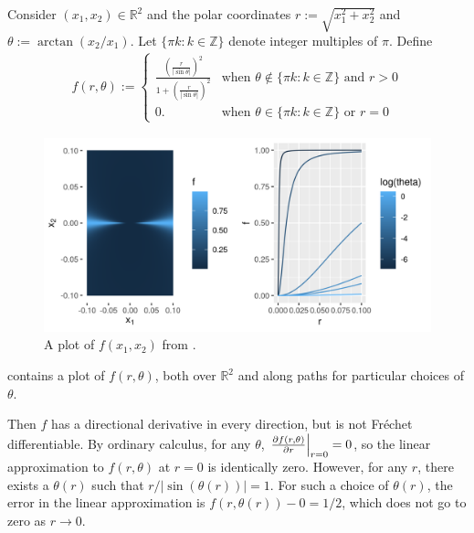 \begin{ex}
%
Consider $(x_1, x_2) \in \mathbb{R}^2$ and the polar coordinates $r :=
\sqrt{x_1^2 + x_2^2}$ and $\theta := \arctan(x_2 / x_1)$.  Let $\{\pi k: k \in
\mathbb{Z} \}$ denote integer multiples of $\pi$.  Define
%
\begin{align*}
%
f(r, \theta) := \begin{cases}
\frac{\left(\frac{r}{| \sin \theta |}\right)^2}
     {1 + \left(\frac{r}{| \sin \theta |}\right)^2}
    & \textrm{when } \theta \notin \{\pi k: k \in \mathbb{Z}\}
    \textrm{ and } r > 0 \\
0. & \textrm{when } \theta \in \{\pi k: k \in \mathbb{Z}
    \} \textrm{ or }r = 0
%
\end{cases}
%
\end{align*}
%
\begin{figure}[h!]

\includegraphics[width=0.980\linewidth,height=0.490\linewidth]{static_images/pathological_r2_example.png}
\caption{A plot of $f(x_1, x_2)$ from .}
\centering
\end{figure}
%
 contains a plot of $f(r, \theta)$, both over
$\mathbb{R}^2$ and along paths for particular choices of $\theta$.

Then $f$ has a directional derivative in every direction, but is not Fr{\'e}chet
differentiable. By ordinary calculus, for any $\theta$, $\left.\frac{\partial f(r,
\theta)}{\partial r}\right\vert_{r=0} = 0$, so the linear approximation to $f(r, \theta)$ at
$r=0$ is identically zero.  However, for any $r$, there exists a $\theta(r)$
such that $r / |\sin(\theta(r))| = 1$.  For such a choice of $\theta(r)$, the
error in the linear approximation is $f(r, \theta(r)) - 0 = 1/2$, which does not
go to zero as $r \rightarrow 0$.


\end{ex}
